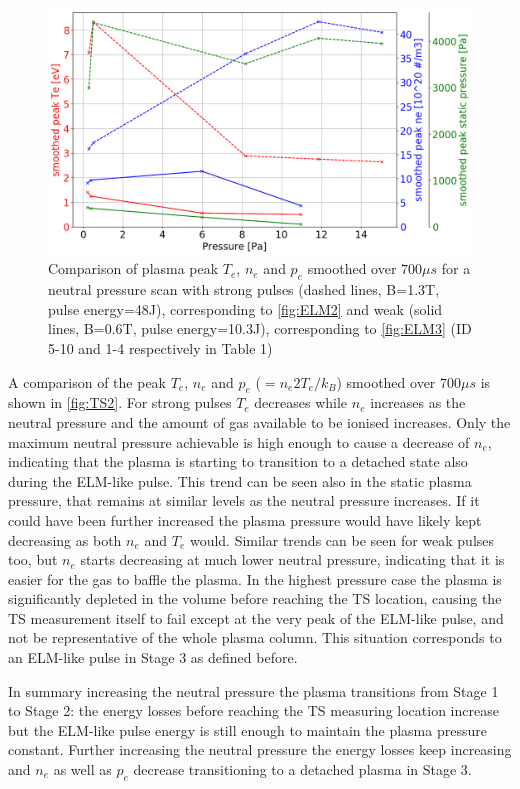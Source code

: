 \begin{figure}[!ht]
	\centering
	\includegraphics[width=0.7\linewidth,trim={0 0 0 0},clip]{Chapters/chapter3/figs/pure_TS_compare.png}
	\caption{Comparison of plasma peak $T_e$, $n_e$ and $p_e$ smoothed over $700 \mu s$ for a neutral pressure scan with strong pulses (dashed lines, B=1.3T, pulse energy=48J), corresponding to \autoref{fig:ELM2} and weak (solid lines, B=0.6T, pulse energy=10.3J), corresponding to \autoref{fig:ELM3} (ID 5-10 and 1-4 respectively in Table 1)}
	\label{fig:TS2}
\end{figure}

A comparison of the peak $T_e$, $n_e$ and $p_e$ ($=n_e2T_e/k_B$) smoothed over $700 \mu s$ is shown in \autoref{fig:TS2}. For strong pulses $T_e$ decreases while $n_e$ increases as the neutral pressure and the amount of gas available to be ionised increases. Only the maximum neutral pressure achievable is high enough to cause a decrease of $n_e$, indicating that the plasma is starting to transition to a detached state also during the ELM-like pulse. This trend can be seen also in the static plasma pressure, that remains at similar levels as the neutral pressure increases. If it could have been further increased the plasma pressure would have likely kept decreasing as both $n_e$ and $T_e$ would. Similar trends can be seen for weak pulses too, but $n_e$ starts decreasing at much lower neutral pressure, indicating that it is easier for the gas to baffle the plasma. In the highest pressure case the plasma is significantly depleted in the volume before reaching the TS location, causing the TS measurement itself to fail except at the very peak of the ELM-like pulse, and not be representative of the whole plasma column. This situation corresponds to an ELM-like pulse in Stage 3 as defined before.

In summary increasing the neutral pressure the plasma transitions from Stage 1 to Stage 2: the energy losses before reaching the TS measuring location increase but the ELM-like pulse energy is still enough to maintain the plasma pressure constant. Further increasing the neutral pressure the energy losses keep increasing and $n_e$ as well as $p_e$ decrease transitioning to a detached plasma in Stage 3.

